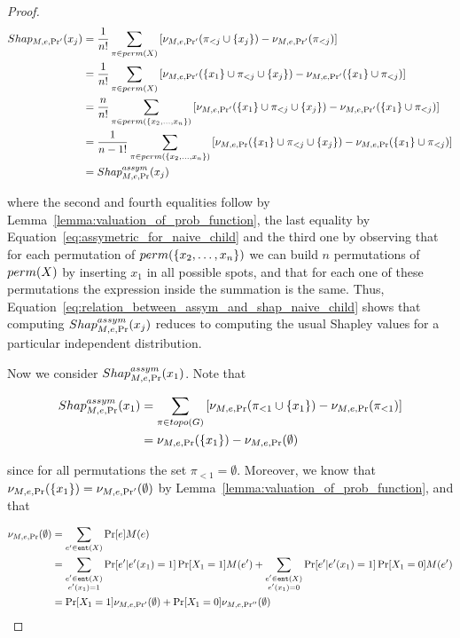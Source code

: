 \begin{proof}
    \begin{align*}
        Shap_{M,e,\Pr'}(x_j) &= \frac{1}{n!} \sum_{\pi \in perm(X)} \left[ \nu_{M,e,\Pr'}(\pi_{<j} \cup \{x_j\}) - \nu_{M,e,\Pr'}(\pi_{<j}) \right]\\
        &= \frac{1}{n!} \sum_{\pi \in perm(X)} \left[ \nu_{M,e,\Pr'}(\{x_1\} \cup \pi_{<j} \cup \{x_j\}) - \nu_{M,e,\Pr'}(\{x_1\} \cup \pi_{<j}) \right]\\
        &= \frac{n}{n!} \sum_{\pi \in perm(\{x_2,\ldots,x_n\})} \left[ \nu_{M,e,\Pr'}(\{x_1\} \cup \pi_{<j} \cup \{x_j\}) - \nu_{M,e,\Pr'}(\{x_1\} \cup \pi_{<j}) \right] \\
        &= \frac{1}{n-1!} \sum_{\pi \in perm(\{x_2,\ldots,x_n\})} \left[ \nu_{M,e,\Pr}(\{x_1\} \cup \pi_{<j} \cup \{x_j\}) - \nu_{M,e,\Pr}(\{x_1\} \cup \pi_{<j}) \right]\\
        &= Shap^{assym}_{M,e,\Pr}(x_j)
    \end{align*}

    where the second and fourth equalities follow by Lemma~\ref{lemma:valuation_of_prob_function}, the last equality by Equation~\ref{eq:assymetric_for_naive_child} and the third one by observing that for each permutation of $perm(\{x_2,\ldots,x_n\})$ we can build $n$ permutations of $perm(X)$ by inserting $x_1$ in all possible spots, and that for each one of these permutations the expression inside the summation is the same. Thus, Equation~\ref{eq:relation_between_assym_and_shap_naive_child} shows that computing $Shap^{assym}_{M,e,\Pr}(x_j)$ reduces to computing the usual Shapley values for a particular independent distribution.

    Now we consider $Shap^{assym}_{M,e,\Pr}(x_1)$. Note that

    \begin{align*}
        Shap^{assym}_{M,e,\Pr}(x_1) &= \sum_{\pi \in topo(G)} \left[ \nu_{M,e,\Pr}(\pi_{<1} \cup \{x_1\}) - \nu_{M,e,\Pr}(\pi_{<1}) \right]\\
        &= \nu_{M,e,\Pr}(\{x_1\}) - \nu_{M,e,\Pr}(\emptyset)
    \end{align*}

    since for all permutations the set $\pi_{<1} = \emptyset$. Moreover, we know that $\nu_{M,e,\Pr}(\{x_1\}) = \nu_{M,e,\Pr'}(\emptyset)$ by Lemma~\ref{lemma:valuation_of_prob_function}, and that

    \begin{align*}
        \nu_{M,e,\Pr}(\emptyset) &= \sum_{e' \in \texttt{ent}(X)} \Pr[e] M(e)\\
        &= \sum_{\substack{e' \in \texttt{ent}(X) \\ e'(x_1) = 1}} \Pr[e' | e'(x_1) = 1] \Pr[X_1 = 1] M (e') + \sum_{\substack{e' \in \texttt{ent}(X) \\ e'(x_1) = 0}} \Pr[e' | e'(x_1) = 1] \Pr[X_1 = 0] M (e')\\
        &= \Pr[X_1 = 1] \nu_{M,e,\Pr'}(\emptyset) + \Pr[X_1 = 0] \nu_{M,e,\Pr''}(\emptyset)
    \end{align*}


\end{proof}
